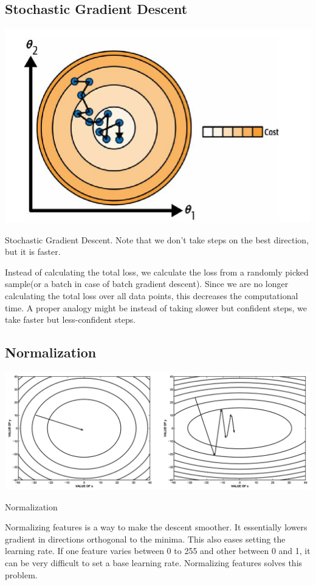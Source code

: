 \subsection{Stochastic Gradient Descent}
\begin{marginfigure}
    \includegraphics[width=\textwidth]{graphics/stochastic gradient descent.png}
    \caption{Stochastic Gradient Descent. Note that we don't take steps on the best direction, but it is faster.\citep{geron2022hands}}
\end{marginfigure}
Instead of calculating the total loss, we calculate the loss from a randomly picked sample(or a
batch in case of batch gradient descent). Since we are no longer calculating the total loss over all
data points, this decreases the computational time. A proper analogy might be instead of taking
slower but confident steps, we take faster but less-confident steps.
\subsection{Normalization}
\begin{marginfigure}
    \includegraphics[width=\textwidth]{graphics/normalise.png}
    \caption{Normalization\citep{aggarwal2018neural}}
\end{marginfigure}
Normalizing features is a way to make the descent smoother. It essentially lowers gradient in
directions orthogonal to the minima. This also eases setting the learning rate. If one feature varies between $0$ to 255 and other between 0 and 1, it can be very difficult to set a base learning rate. Normalizing features solves this problem.  
